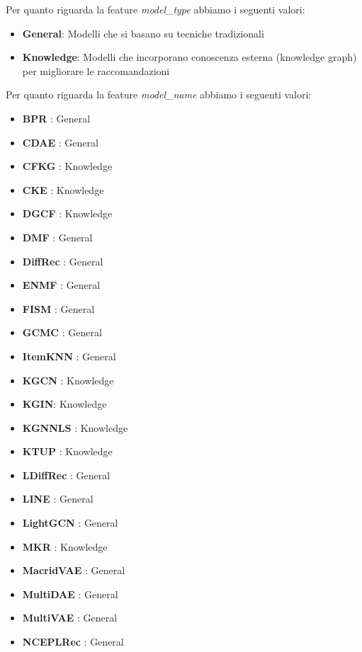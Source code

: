Per quanto riguarda la feature \textit{model\_type} abbiamo i seguenti valori:
\begin{itemize}
    \item \textbf{General}: Modelli che si basano su tecniche tradizionali
    \item \textbf{Knowledge}: Modelli che incorporano conoscenza esterna (knowledge graph) per migliorare le raccomandazioni
\end{itemize}

Per quanto riguarda la feature \textit{model\_name} abbiamo i seguenti valori:
\begin{itemize}
    \item \textbf{BPR} \cite{BPR}: General
    \item \textbf{CDAE} \cite{CDAE}: General
    \item \textbf{CFKG} \cite{CFKG}: Knowledge
    \item \textbf{CKE} \cite{CKE}: Knowledge
    \item \textbf{DGCF} \cite{DGCF}: Knowledge
    \item \textbf{DMF} \cite{DMF}: General
    \item \textbf{DiffRec} \cite{DiffRec}: General
    \item \textbf{ENMF} \cite{ENMF}: General 
    \item \textbf{FISM} \cite{FISM}: General
    \item \textbf{GCMC} \cite{GCMC}: General
    \item \textbf{ItemKNN} \cite{ItemKNN}: General
    \item \textbf{KGCN} \cite{KGCN}: Knowledge
    \item \textbf{KGIN}: \cite{KGIN} Knowledge
    \item \textbf{KGNNLS} \cite{KGNNLS}: Knowledge
    \item \textbf{KTUP} \cite{KTUP}: Knowledge
    \item \textbf{LDiffRec} \cite{LDiffRec}: General
    \item \textbf{LINE} \cite{LINE}: General
    \item \textbf{LightGCN} \cite{LightGCN}: General
    \item \textbf{MKR} \cite{MKR}: Knowledge
    \item \textbf{MacridVAE} \cite{MacridVAE}: General
    \item \textbf{MultiDAE} \cite{MultiDAE}: General
    \item \textbf{MultiVAE} \cite{MultiVAE}: General
    \item \textbf{NCEPLRec} \cite{NCEPLRec}: General

\end{itemize}
